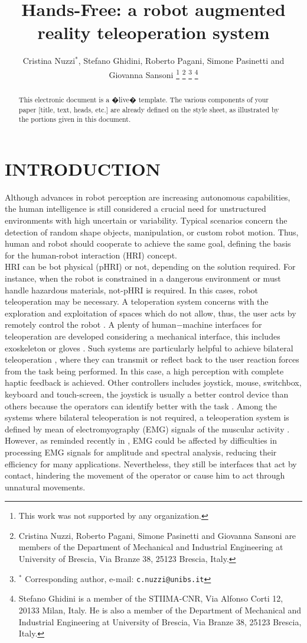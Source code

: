 \documentclass[letterpaper, 10 pt, conference]{ieeeconf}  %
\title{\LARGE \bf
Hands-Free: a robot augmented reality teleoperation system
}
\author{Cristina Nuzzi$^{*}$, Stefano Ghidini, Roberto Pagani, Simone Pasinetti and Giovanna Sansoni %
\thanks{This work was not supported by any organization.}%
\thanks{Cristina Nuzzi, Roberto Pagani, Simone Pasinetti and Giovanna Sansoni are members of the Department of Mechanical and Industrial Engineering at University of Brescia, Via Branze 38, 25123 Brescia, Italy.}
\thanks{$^{*}$ Corresponding author, e-mail: {\tt\small c.nuzzi@unibs.it}}%
\thanks{Stefano Ghidini is a member of the STIIMA-CNR, Via Alfonso Corti 12, 20133 Milan, Italy. He is also a member of the Department of Mechanical and Industrial Engineering at University of Brescia, Via Branze 38, 25123 Brescia, Italy.}
}
\begin{document}
\maketitle
\thispagestyle{empty}
\pagestyle{empty}

\begin{abstract}

This electronic document is a �live� template. The various components of your paper [title, text, heads, etc.] are already defined on the style sheet, as illustrated by the portions given in this document.

\end{abstract}


\section{INTRODUCTION}
Although advances in robot perception are increasing autonomous capabilities, the human intelligence is still considered a crucial need for unstructured environments with high uncertain or variability. Typical scenarios concern the detection of random shape objects, manipulation, or custom robot motion. Thus, human and robot should cooperate to achieve the same goal, defining the basis for the human-robot interaction (HRI) concept.\\
HRI can be bot physical (pHRI) or not, depending on the solution required. For instance, when the robot is constrained in a dangerous environment or must handle hazardous materials, not-pHRI is required. In this cases, robot teleoperation may be necessary. A teloperation system concerns with the exploration and exploitation of spaces which do not allow, thus, the user acts by remotely control the robot \cite{VERTUTJean;COEFFET}. A plenty of human$-$machine interfaces for teleoperation are developed considering a mechanical interface, this includes exoskeleton \cite{Rebelo2014} or gloves \cite{Lv2006}. Such systems are particularly helpful to achieve bilateral teleoperation \cite{Hokayem2006}, where they can transmit or reflect back to the user reaction forces from the task being performed. In this case, a high perception with complete haptic feedback \cite{Glover2009} is achieved. Other controllers includes joystick,  mouse,  switchbox, keyboard and touch-screen, the joystick is usually a better control device than others because the operators can identify better with the task \cite{Boboc2012}. Among the systems where bilateral teleoperation is not required, a teleoperation system is defined by mean of electromyography (EMG) signals of the muscular activity \cite{Vogel2011,Hassan2019}. However, as reminded recently in \cite{Roveda2018a}, EMG could be affected by difficulties in processing EMG signals for amplitude and spectral analysis, reducing their efficiency for many applications. Nevertheless, they still be interfaces that act by contact, hindering the movement of the operator or cause him to act through unnatural movements.\\
\end{document}
